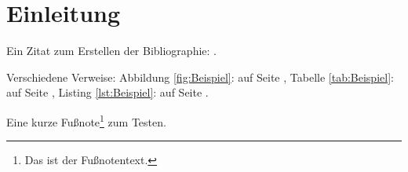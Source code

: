 \section{Einleitung}
\label{sec:Einleitung}

Ein Zitat zum Erstellen der Bibliographie: \cite[\vgl][S. 22]{Martin2008a}.

Verschiedene Verweise: Abbildung \ref{fig:Beispiel}:  auf Seite \pageref{fig:Beispiel}, Tabelle \ref{tab:Beispiel}:  auf Seite \pageref{tab:Beispiel}, Listing \ref{lst:Beispiel}:  auf Seite \pageref{lst:Beispiel}.

Eine kurze Fußnote\footnote{Das ist der Fußnotentext.} zum Testen.